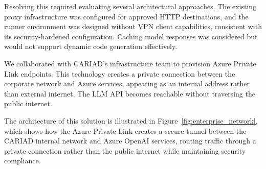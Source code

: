 Resolving this required evaluating several architectural approaches. The existing proxy infrastructure was configured for approved HTTP destinations, and the runner environment was designed without VPN client capabilities, consistent with its security-hardened configuration. Caching model responses was considered but would not support dynamic code generation effectively.

We collaborated with CARIAD's infrastructure team to provision Azure Private Link endpoints. This technology creates a private connection between the corporate network and Azure services, appearing as an internal address rather than external internet. The LLM API becomes reachable without traversing the public internet.

The architecture of this solution is illustrated in Figure~\ref{fig:enterprise_network}, which shows how the Azure Private Link creates a secure tunnel between the CARIAD internal network and Azure OpenAI services, routing traffic through a private connection rather than the public internet while maintaining security compliance.


